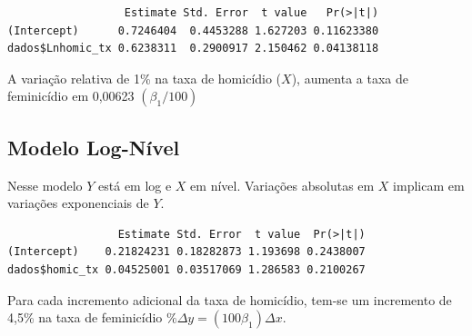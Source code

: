 \documentclass[
  letterpaper,
  DIV=11,
  numbers=noendperiod]{scrreprt}
\newenvironment{Shaded}{\begin{snugshade}}{\end{snugshade}}
\newcommand{\AttributeTok}[1]{\textcolor[rgb]{0.40,0.45,0.13}{#1}}
\newcommand{\FunctionTok}[1]{\textcolor[rgb]{0.28,0.35,0.67}{#1}}
\newcommand{\NormalTok}[1]{\textcolor[rgb]{0.00,0.23,0.31}{#1}}
\newcommand{\OtherTok}[1]{\textcolor[rgb]{0.00,0.23,0.31}{#1}}
\newcommand{\SpecialCharTok}[1]{\textcolor[rgb]{0.37,0.37,0.37}{#1}}
\begin{document}
\begin{Shaded}
\end{Shaded}

\begin{verbatim}
                  Estimate Std. Error  t value   Pr(>|t|)
(Intercept)      0.7246404  0.4453288 1.627203 0.11623380
dados$Lnhomic_tx 0.6238311  0.2900917 2.150462 0.04138118
\end{verbatim}

A variação relativa de 1\% na taxa de homicídio (\(X\)), aumenta a taxa
de feminicídio em 0,00623 \((\beta_1/100)\)

\subsection{Modelo Log-Nível}\label{modelo-log-nuxedvel}

Nesse modelo \(Y\) está em log e \(X\) em nível. Variações absolutas em
\(X\) implicam em variações exponenciais de \(Y\).

\begin{Shaded}
\end{Shaded}

\begin{verbatim}
                 Estimate Std. Error  t value  Pr(>|t|)
(Intercept)    0.21824231 0.18282873 1.193698 0.2438007
dados$homic_tx 0.04525001 0.03517069 1.286583 0.2100267
\end{verbatim}

Para cada incremento adicional da taxa de homicídio, tem-se um
incremento de 4,5\% na taxa de feminicídio
\(\% \Delta y = (100 \beta_1) \Delta x\).
\end{document}
